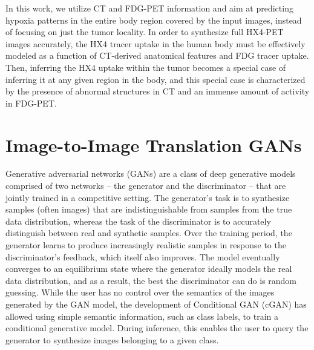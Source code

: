 In this work, we utilize CT and FDG-PET information and aim at predicting hypoxia patterns in the entire body region covered by the input images, instead of focusing on just the tumor locality. In order to synthesize full HX4-PET images accurately, the HX4 tracer uptake in the human body must be effectively modeled as a function of CT-derived anatomical features and FDG tracer uptake. Then, inferring the HX4 uptake within the tumor becomes a special case of inferring it at any given region in the body, and this special case is characterized by the presence of abnormal structures in CT and an immense amount of activity in FDG-PET.



\section{Image-to-Image Translation GANs}
Generative adversarial networks (GANs) \cite{goodfellow2014generative} are a class of deep generative models comprised of two networks -- the generator and the discriminator -- that are jointly trained in a competitive setting. The generator's task is to synthesize samples (often images) that are indistinguishable from samples from the true data distribution, whereas the task of the discriminator is to accurately distinguish between real and synthetic samples. Over the training period, the generator learns to produce increasingly realistic samples in response to the discriminator's feedback, which itself also improves. The model eventually converges to an equilibrium state where the generator ideally models the real data distribution, and as a result, the best the discriminator can do is random guessing. While the user has no control over the semantics of the images generated by the GAN model, the development of Conditional GAN (cGAN) \cite{mirza2014conditional} has allowed using simple semantic information, such as class labels, to train a conditional generative model. During inference, this enables the user to query the generator to synthesize images belonging to a given class. 

